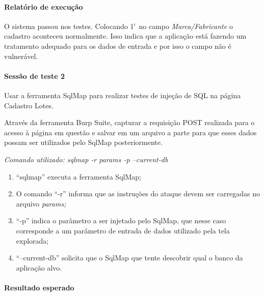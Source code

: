 \documentclass[
    12pt,               %
    openright,          %
    oneside,            %
    a4paper,            %
    section=TITLE,     %
    english,            %
    french,             %
    spanish,            %
    brazil              %
    ]{abntex2}
\newcommand{\citep}{\cite}
\begin{document}
\paragraph*{Relatório de execução}



O sistema passou nos testes. Colocando 1$\lq$ no campo \emph{Marca/Fabricante} o cadastro aconteceu normalmente. Isso indica que a aplicação está fazendo um tratamento adequado para os dados de entrada e por isso o campo não é vulnerável.



\paragraph*{Sessão de teste 2}

Usar a ferramenta SqlMap para realizar testes de injeção de SQL na página Cadastro Lotes.


Através da ferramenta Burp Suite, capturar a requisição POST realizada para o acesso à página em questão e salvar em um arquivo a parte para que esses dados possam ser utilizados pelo SqlMap posteriormente.~\citep{62205}


\emph{Comando utilizado: sqlmap -r params -p --current-db}



\begin{enumerate}[start=1]
	
\item \textquotedblleft{}sqlmap\textquotedblright{} executa a ferramenta SqlMap;
	
\item O comando \textquotedblleft{}-r\textquotedblright{} informa que as instruções do ataque devem ser carregadas no arquivo \emph{params;}
	
\item \textquotedblleft{}-p\textquotedblright{} indica o parâmetro a ser injetado pelo SqlMap, que nesse caso corresponde a um parâmetro de entrada de dados utilizado pela tela explorada;
	
\item \textquotedblleft{}--current-db\textquotedblright{} solicita que o SqlMap que tente descobrir qual o banco da aplicação alvo.

\end{enumerate}


\paragraph*{Resultado esperado}
\end{document}
